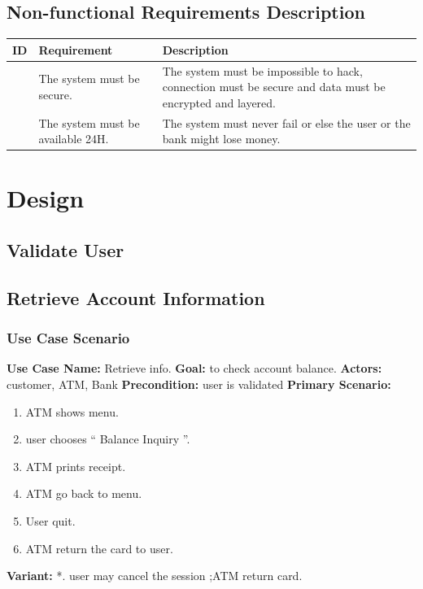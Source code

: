\documentclass{article}
\newcounter{magicrownumbers}
\newcommand\rownumber{\stepcounter{magicrownumbers}\arabic{magicrownumbers}}
\begin{document}
	\newpage\subsection{Non-functional Requirements Description}
	\setcounter{magicrownumbers}{0}
	\def\arraystretch{2}
	\begin{table}[h!]
		\begin{center}
			\begin{tabularx}{\textwidth}{r|X|X}
				\textbf{ID} & 
				\textbf{Requirement} & 
				\textbf{Description}\\
				\hline
				\rownumber &
				The system must be secure. &
				The system must be impossible to hack, connection must be secure and data must be encrypted and layered.
				\\
				\hline

				\rownumber &
				The system must be available 24H. &
				The system must never fail or else the user or the bank might lose money.
				\\
			
			\end{tabularx}
		\end{center}
	\end{table}

	\newpage\section{Design}
	\newpage\subsection{Validate User}
	\newpage\subsection{Retrieve Account Information}
	\subsubsection{Use Case Scenario}
		\textbf{Use Case Name:}	Retrieve info.
		\newline\textbf{Goal:} to check account balance.
		\newline\textbf{Actors:} customer, ATM, Bank 	
		\newline\textbf{Precondition:} user is validated 	
		\newline\textbf{Primary Scenario:}	
			\begin{enumerate}[label*=\arabic*.]
				\item ATM shows menu.
				\item user chooses “ Balance Inquiry ”.
				\item ATM prints receipt.
				\item ATM go back to menu.
				\item User quit.
				\item ATM return the card to user.
			\end{enumerate}
		\textbf{Variant:}\newline	
			\hspace*{5mm}*. user may cancel the session ;ATM return card.
\end{document}
